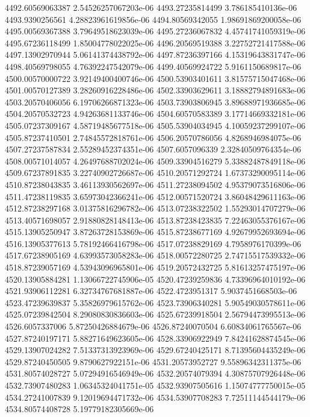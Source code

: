 {4492.60569063387 2.54526257067203e-06
4493.27235814499 3.786185410136e-06
4493.9390256561 4.28823961619856e-06
4494.80569342055 1.98691869200058e-06
4495.00569367388 3.79649518623039e-06
4495.27236067832 4.45741741059319e-06
4495.67236118499 1.85004778022025e-06
4496.20569519388 3.22752721417588e-06
4497.13902970944 5.06141374438792e-06
4497.87236397166 4.15319643831747e-06
4498.40569798055 4.76392247542079e-06
4499.40569924722 5.9161150689817e-06
4500.00570000722 3.92149400400746e-06
4500.53903401611 3.81575715047468e-06
4501.00570127389 3.28260916228486e-06
4502.33903629611 3.18882794891683e-06
4503.20570406056 6.19706266871323e-06
4503.73903806945 3.89688971936685e-06
4504.20570532723 4.94263681133746e-06
4504.60570583389 3.17714669332181e-06
4505.07237309167 4.58719485677518e-06
4505.53904034945 4.10059237299107e-06
4505.87237410501 2.74845572818761e-06
4506.20570786056 4.8268946984075e-06
4507.27237587834 2.55289452374351e-06
4507.6057096339 2.32840509764354e-06
4508.00571014057 4.26497688702024e-06
4509.33904516279 5.33882487849118e-06
4509.67237891835 3.22740902726687e-06
4510.20571292724 1.67373290095114e-06
4510.87238043835 3.46113930562697e-06
4511.27238094502 4.95379073516806e-06
4511.47238119835 3.65973042366241e-06
4512.00571520724 3.86048429611163e-06
4512.87238297168 3.01375816296782e-06
4513.07238322502 1.55293014707279e-06
4513.40571698057 2.91880828148413e-06
4513.87238423835 7.22463055376167e-06
4515.13905250947 3.87263728153869e-06
4515.87238677169 4.92679952693694e-06
4516.13905377613 5.78192466416798e-06
4517.07238829169 4.7958976170399e-06
4517.67238905169 4.63993573058283e-06
4518.00572280725 2.74715517539332e-06
4518.87239057169 4.53943096965801e-06
4519.20572432725 5.81613257475197e-06
4520.13905884281 1.13066722745906e-05
4520.47239259836 4.73396964010192e-06
4521.93906112281 6.32734767681887e-06
4522.4723951317 5.9037451668503e-06
4523.47239639837 5.35826979615762e-06
4523.73906340281 5.90549030578611e-06
4525.07239842504 8.29080830836603e-06
4525.67239918504 2.56794473995513e-06
4526.6057337006 5.87250426884679e-06
4526.87240070504 6.60834061765567e-06
4527.87240197171 5.88271649623605e-06
4528.33906922949 7.84241628874545e-06
4529.13907024282 7.51337313923969e-06
4529.67240425171 8.71395604435249e-06
4529.87240450505 9.8790627922151e-06
4531.20573952727 9.55896342311375e-06
4531.80574028727 5.07294916546949e-06
4532.20574079394 4.30875707926448e-06
4532.73907480283 1.06345324041751e-05
4532.93907505616 1.15074777750015e-05
4534.27241007839 9.12019694471732e-06
4534.53907708283 7.72511144544179e-06
4534.80574408728 5.19779182305669e-06
}

